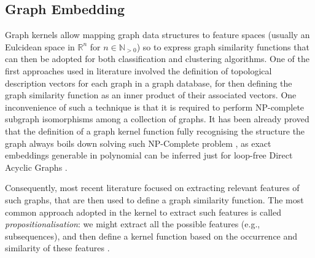 \subsection{Graph Embedding}\label{ssec:ge}
Graph kernels allow mapping graph data structures to feature spaces (usually an Eulcidean space in $\mathbb{R}^n$ for $n\in \mathbb{N}_{>0}$) \cite{Samatova} so to express graph similarity functions that can then be adopted for both classification \cite{TsudaS10} and clustering \cite{Raedt} algorithms. One of the first approaches used in literature involved the definition of topological description vectors \cite{Sidere} for each graph in a graph database, for then defining the graph similarity function as an inner product of their associated vectors. One inconvenience of such a technique is that it is required to perform NP-complete subgraph isomorphisms among a collection of graphs. It has been already proved that the definition of a graph kernel function fully recognising the structure the graph always boils down solving such  NP-Complete problem \cite{GartnerFW03}, as exact embeddings generable in polynomial can be inferred just for loop-free Direct Acyclic Graphs \cite{BergamiBM20}.  


Consequently, most recent literature focused on extracting relevant features of such graphs, that are then used to define a graph similarity function. The most common approach adopted in the kernel to extract such features is called \textit{propositionalisation}: we might extract all the possible features (e.g., subsequences), and then define a kernel function based on the occurrence and similarity of these features \cite{Gartner03}. 

